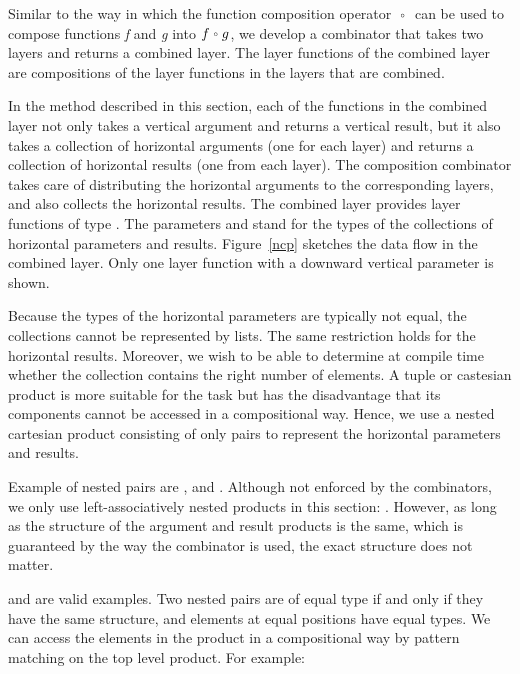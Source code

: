 \documentclass[preprint,natbib]{sigplanconf}
\begin{document}
Similar to the way in which the function composition operator $\oo$ can be used to compose functions {\em f} and {\em g} into $f \oo g$, we develop a  combinator that takes two layers and returns a combined layer. The layer functions of the combined layer are compositions of the layer functions in the layers that are combined.

In the method described in this section, each of the functions in the combined layer not only takes a vertical argument and returns a vertical result, but it also takes a collection of horizontal arguments (one for each layer) and returns a collection of horizontal results (one from each layer). The composition combinator takes care of distributing the horizontal arguments to the corresponding layers, and also collects the horizontal results. The combined layer provides layer functions of type . The parameters  and  stand for the types of the collections of horizontal parameters and results. Figure~\ref{ncp} sketches the data flow in the combined layer. Only one layer function with a downward vertical parameter is shown.

Because the types of the horizontal parameters are typically not equal, the collections cannot be represented by lists. The same restriction holds for the horizontal results. Moreover, we wish to be able to determine at compile time whether the collection contains the right number of elements. A tuple or castesian product is more suitable for the task but has the disadvantage that its components cannot be accessed in a compositional way. Hence, we use a nested cartesian product consisting of only pairs to represent the horizontal parameters and results.

Example of nested pairs are , and . Although not enforced by the combinators, we only use left-associatively nested products in this section: 
. However, as long as the structure of the argument and result products is the same, which is guaranteed by the way the  combinator is used, the exact structure does not matter.


\bc and  are valid examples.\ec
 \bc Two nested pairs are of equal type if and only if they have the same structure, and elements at equal positions have equal types. We can access the elements in the product in a compositional way by pattern matching on the top level product. For example:  \ec
\end{document}
